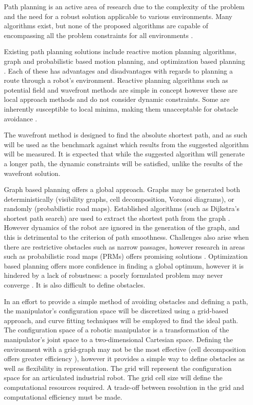 %
Path planning is an active area of research due to the complexity of the problem and the need for a robust solution applicable to various environments. Many algorithms exist, but none of the proposed algorithms are capable of encompassing all the problem constraints for all environments \cite{sariff06}.

Existing path planning solutions include reactive motion planning algorithms, graph and probabilistic based motion planning, and optimization based planning \cite{waslanderI}. Each of these has advantages and disadvantages with regards to planning a route through a robot's environment. Reactive planning algorithms such as potential field and wavefront methods are simple in concept however these are local approach methods and do not consider dynamic constraints. Some are inherently susceptible to local minima, making them unacceptable for obstacle avoidance \cite{koren91}.

The wavefront method is designed to find the absolute shortest path, and as such will be used as the benchmark against which results from the suggested algorithm will be measured. It is expected that while the suggested algorithm will generate a longer path, the dynamic constraints will be satisfied, unlike the results of the wavefront solution.

Graph based planning offers a global approach. Graphs may be generated both deterministically (visibility graphs, cell decomposition, Voronoi diagrams), or randomly (probabilistic road maps). Established algorithms (such as Dijkstra's shortest path search) are used to extract the shortest path from the graph \cite{dijkstra59}. However dynamics of the robot are ignored in the generation of the graph, and this is detrimental to the criterion of path smoothness. Challenges also arise when there are restrictive obstacles such as narrow passages, however research in areas such as probabilistic road maps (PRMs) offers promising solutions \cite{hsu03}. Optimization based planning offers more confidence in finding a global optimum, however it is hindered by a lack of robustness: a poorly formulated problem may never converge \cite{waslanderIII}. It is also difficult to define obstacles.

In an effort to provide a simple method of avoiding obstacles and defining a path, the manipulator's configuration space will be discretized using a grid-based approach, and curve fitting techniques will be employed to find the ideal path. The configuration space of a robotic manipulator is a transformation of the manipulator's joint space to a two-dimensional Cartesian space. Defining the environment with a grid-graph may not be the most effective (cell decomposition offers greater efficiency \cite{lingelbach04}), however it provides a simple way to define obstacles as well as flexibility in representation. The grid will represent the configuration space for an articulated industrial robot. The grid cell size will define the computational resources required. A trade-off between resolution in the grid and computational efficiency must be made.

